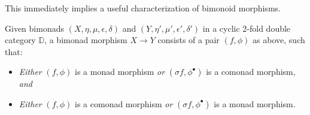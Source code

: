 This immediately implies a useful characterization of bimonoid morphisms.

\begin{corollary}\label{Cor:BimonMorphism}
	Given bimonads $(X,\eta,\mu,\epsilon,\delta)$ and $(Y,\eta',\mu',\epsilon',\delta')$ in a cyclic 2-fold double category $\mathbb{D}$, a bimonad morphism $X\to Y$ consists of a pair $(f,\phi)$ as above, such that:
	\begin{itemize}
		\item \emph{Either} $(f,\phi)$ is a monad morphism \emph{or} $(\sigma f,\phi^{\bullet})$ is a comonad morphism, \emph{and}
		\item \emph{Either} $(f,\phi)$ is a comonad morphism \emph{or} $(\sigma f,\phi^{\bullet})$ is a monad morphism.
	\end{itemize}
\end{corollary}